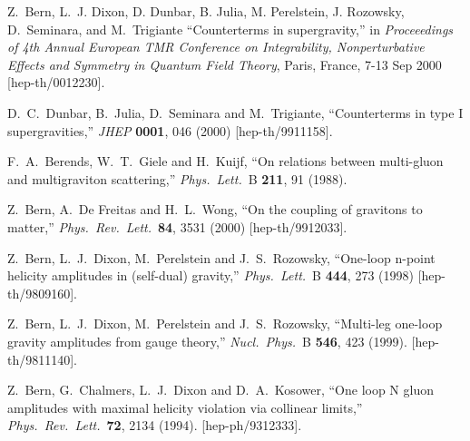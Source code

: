 \begin{thebibliography}{99}
Z.~Bern, L.~J. Dixon, D. Dunbar, B. Julia, M. Perelstein, J. Rozowsky, 
D.~Seminara, and M.~Trigiante 
``Counterterms in supergravity,''
in 
{\it Proceeedings of 4th Annual European TMR Conference on Integrability,
 Nonperturbative Effects and Symmetry in Quantum Field Theory}, 
Paris, France, 7-13 Sep 2000 
[hep-th/0012230].

D.~C.~Dunbar, B.~Julia, D.~Seminara and M.~Trigiante,
``Counterterms in type I supergravities,''
{\it JHEP} {\bf 0001}, 046 (2000)
[hep-th/9911158].

F.~A.~Berends, W.~T.~Giele and H.~Kuijf,
``On relations between multi-gluon and multigraviton scattering,''
{\it Phys.\ Lett.}\ B {\bf 211}, 91 (1988).

Z.~Bern, A.~De Freitas and H.~L.~Wong,
``On the coupling of gravitons to matter,''
{\it Phys.\ Rev.\ Lett.}\  {\bf 84}, 3531 (2000)
[hep-th/9912033].

Z.~Bern, L.~J.~Dixon, M.~Perelstein and J.~S.~Rozowsky,
``One-loop n-point helicity amplitudes in (self-dual) gravity,''
{\it Phys.\ Lett.}\ B {\bf 444}, 273 (1998)
[hep-th/9809160].

Z.~Bern, L.~J.~Dixon, M.~Perelstein and J.~S.~Rozowsky,
``Multi-leg one-loop gravity amplitudes from gauge theory,''
{\it Nucl.\ Phys.}\ B {\bf 546}, 423 (1999).
[hep-th/9811140].

Z.~Bern, G.~Chalmers, L.~J.~Dixon and D.~A.~Kosower,
``One loop N gluon amplitudes with maximal helicity violation 
via collinear limits,''
{\it Phys.\ Rev.\ Lett.}\  {\bf 72}, 2134 (1994).
[hep-ph/9312333].


\end{thebibliography}
